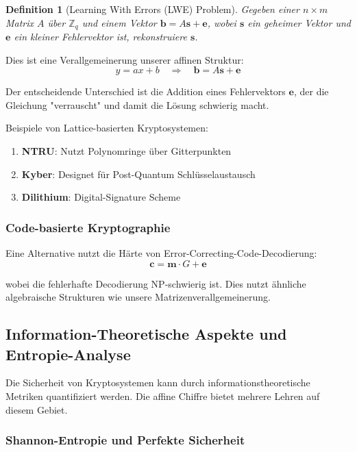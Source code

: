 ﻿\documentclass[12pt,a4paper]{article}
\newtheorem{definition}{Definition}
\begin{document}
	\begin{definition}[Learning With Errors (LWE) Problem]
		Gegeben einer $n \times m$ Matrix $A$ über $\mathbb{Z}_q$ und einem Vektor $\mathbf{b} = A\mathbf{s} + \mathbf{e}$, wobei $\mathbf{s}$ ein geheimer Vektor und $\mathbf{e}$ ein kleiner Fehlervektor ist, rekonstruiere $\mathbf{s}$.
	\end{definition}
	
	Dies ist eine Verallgemeinerung unserer affinen Struktur:
	\begin{equation}
		y = ax + b \quad \Rightarrow \quad \mathbf{b} = A\mathbf{s} + \mathbf{e}
	\end{equation}
	
	Der entscheidende Unterschied ist die Addition eines Fehlervektors $\mathbf{e}$, der die Gleichung "verrauscht" und damit die Lösung schwierig macht.
	
	Beispiele von Lattice-basierten Kryptosystemen:
	\begin{enumerate}
		\item \textbf{NTRU}: Nutzt Polynomringe über Gitterpunkten
		\item \textbf{Kyber}: Designet für Post-Quantum Schlüsselaustausch
		\item \textbf{Dilithium}: Digital-Signature Scheme
	\end{enumerate}
	
	\subsubsection{Code-basierte Kryptographie}
	
	Eine Alternative nutzt die Härte von Error-Correcting-Code-Decodierung:
	\begin{equation}
		\mathbf{c} = \mathbf{m} \cdot G + \mathbf{e}
	\end{equation}
	
	wobei die fehlerhafte Decodierung NP-schwierig ist. Dies nutzt ähnliche algebraische Strukturen wie unsere Matrizenverallgemeinerung.
	
	
	\subsection{Information-Theoretische Aspekte und Entropie-Analyse}
	
	Die Sicherheit von Kryptosystemen kann durch informationstheoretische Metriken quantifiziert werden. Die affine Chiffre bietet mehrere Lehren auf diesem Gebiet.
	
	\subsubsection{Shannon-Entropie und Perfekte Sicherheit}
	
\end{document}
